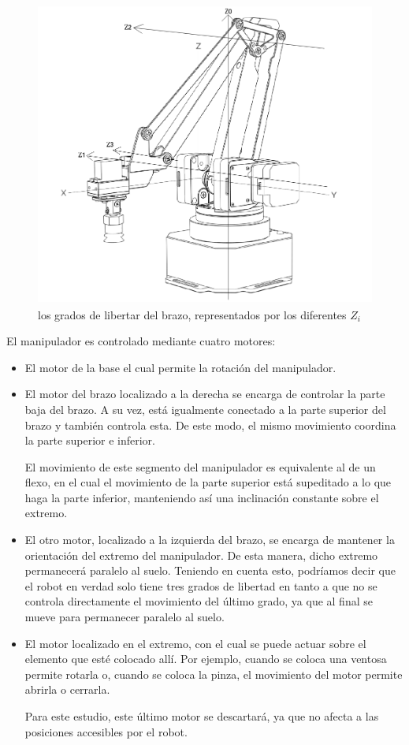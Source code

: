\documentclass[a4paper,12pt]{article}
\begin{document}
\begin{figure}[ht]
    \centering
    \includegraphics[height=10cm]{images/axis.png}
    \caption{los grados de libertar del brazo, representados por los diferentes $Z_i$}
    \label{fig:axis}
\end{figure}

El manipulador es controlado mediante cuatro motores:
\begin{itemize}
    \item El motor de la base el cual permite la rotación del manipulador.
    \item El motor del brazo localizado a la derecha se encarga de controlar la parte baja del brazo.
          A su vez, está igualmente conectado a la parte superior del brazo y también controla esta. 
          De este modo, el mismo movimiento coordina la parte superior e inferior.

          El movimiento de este segmento del manipulador es equivalente al de un flexo,
          en el cual el movimiento de la parte superior está supeditado a lo que haga
          la parte inferior, manteniendo así una inclinación constante sobre el extremo.
    \item El otro motor, localizado a la izquierda del brazo, se encarga de mantener la
          orientación del extremo del manipulador. De esta manera, dicho extremo
          permanecerá paralelo al suelo. Teniendo en cuenta esto, podríamos decir
          que el robot en verdad solo tiene tres grados de libertad en tanto a que no se
          controla directamente el movimiento del último grado, ya que al final se mueve
          para permanecer paralelo al suelo.
    \item El motor localizado en el extremo, con el cual se puede actuar sobre el
          elemento que esté colocado allí. Por ejemplo, cuando se coloca una ventosa
          permite rotarla o, cuando se coloca la pinza, el movimiento del motor permite
          abrirla o cerrarla.

          Para este estudio, este último motor se descartará, ya que no afecta a las
          posiciones accesibles por el robot.
\end{itemize}
\end{document}
